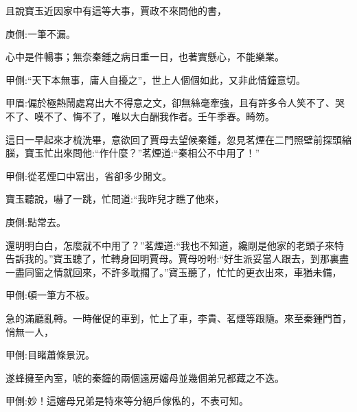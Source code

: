 \begin{parag}
    且說寶玉近因家中有這等大事，賈政不來問他的書，\begin{note}庚側:一筆不漏。\end{note}心中是件暢事；無奈秦鍾之病日重一日，也著實懸心，不能樂業。\begin{note}甲側:“天下本無事，庸人自擾之”，世上人個個如此，又非此情鐘意切。\end{note}\begin{note}甲眉:偏於極熱鬧處寫出大不得意之文，卻無絲毫牽強，且有許多令人笑不了、哭不了、嘆不了、悔不了，唯以大白酬我作者。壬午季春。畸笏。\end{note}這日一早起來才梳洗畢，意欲回了賈母去望候秦鍾，忽見茗煙在二門照壁前探頭縮腦，寶玉忙出來問他:“作什麼？”茗煙道:“秦相公不中用了！”\begin{note}甲側:從茗煙口中寫出，省卻多少閒文。\end{note}寶玉聽說，嚇了一跳，忙問道:“我昨兒才瞧了他來，\begin{note}庚側:點常去。\end{note}還明明白白，怎麼就不中用了？”茗煙道:“我也不知道，纔剛是他家的老頭子來特告訴我的。”寶玉聽了，忙轉身回明賈母。賈母吩咐:“好生派妥當人跟去，到那裏盡一盡同窗之情就回來，不許多耽擱了。”寶玉聽了，忙忙的更衣出來，車猶未備，\begin{note}甲側:頓一筆方不板。\end{note}急的滿廳亂轉。一時催促的車到，忙上了車，李貴、茗煙等跟隨。來至秦鍾門首，悄無一人，\begin{note}甲側:目睹蕭條景況。\end{note}遂蜂擁至內室，唬的秦鐘的兩個遠房嬸母並幾個弟兄都藏之不迭。\begin{note}甲側:妙！這嬸母兄弟是特來等分絕戶傢俬的，不表可知。\end{note}
\end{parag}


